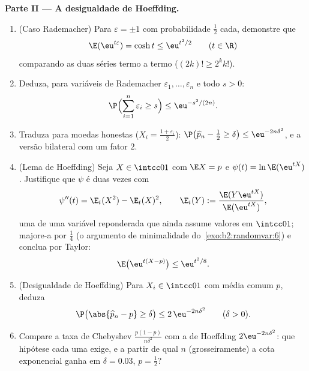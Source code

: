 \begin{problem}
\medskip
\noindent\textbf{Parte II --- A desigualdade de Hoeffding.}
\begin{enumerate}[resume]
  \item (Caso Rademacher) Para $\varepsilon = \pm1$ com
        probabilidade $\frac12$ cada, demonstre que
        \[
        \E(\eu^{t\varepsilon}) = \cosh t \leq \eu^{t^2/2}
        \qquad (t \in \R)
        \]
        comparando as duas séries termo a termo ($(2k)! \geq
        2^kk!$).
  \item Deduza, para variáveis de Rademacher 
        $\varepsilon_1, \dots, \varepsilon_n$ e todo $s >
        0$:
        \[
        \P\Bigl(\sum_{i=1}^n\varepsilon_i \geq s\Bigr)
        \leq \eu^{-s^2/(2n)} .
        \]
  \item Traduza para moedas honestas ($X_i =
        \frac{1+\varepsilon_i}2$): $\P\bigl(\widehat p_n -
        \tfrac12 \geq \delta\bigr) \leq \eu^{-2n\delta^2}$,
        e a versão bilateral com um fator $2$.
  \item (Lema de Hoeffding) Seja $X \in \intcc01$ com $\E X =
        p$ e $\psi(t) = \ln\E(\eu^{tX})$. Justifique que
        $\psi$ é duas vezes  com
        \[
        \psi''(t) = \E_t(X^2) - \E_t(X)^2, \qquad
        \E_t(Y) := \frac{\E(Y\eu^{tX})}{\E(\eu^{tX})},
        \]
        uma \emph{} de uma variável reponderada que ainda
        assume valores em $\intcc01$; majore-a por $\frac14$
        (o argumento de minimalidade do~\cref{exo:b2:randomvar:6}) e
        conclua por Taylor:
        \[
        \E\bigl(\eu^{t(X - p)}\bigr) \leq \eu^{t^2/8} .
        \]
  \item (Desigualdade de Hoeffding) Para $X_i \in
        \intcc01$  com média comum $p$, deduza
        \[
        \P\bigl(\abs{\widehat p_n - p} \geq \delta\bigr)
        \leq 2\,\eu^{-2n\delta^2}
        \qquad (\delta > 0).
        \]
  \item Compare a taxa de Chebyshev
        $\frac{p(1-p)}{n\delta^2}$ com a de Hoeffding
        $2\eu^{-2n\delta^2}$: que hipótese cada uma
        exige, e a partir de qual $n$ (grosseiramente) a
        cota exponencial ganha em $\delta = 0.03$, $p =
        \frac12$?
\end{enumerate}


\end{problem}
